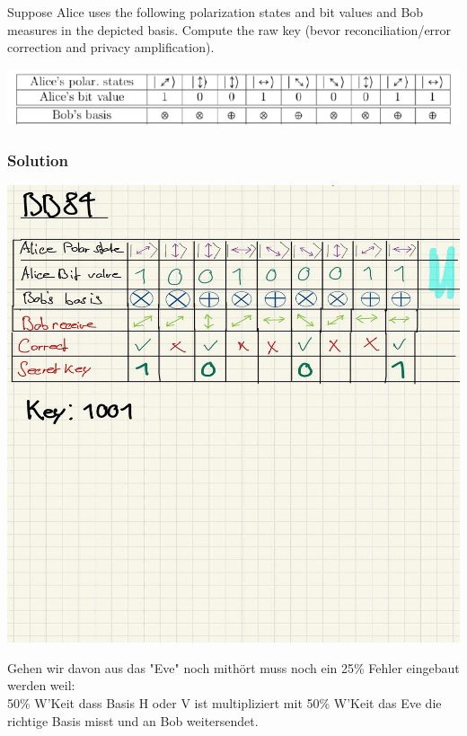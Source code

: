 \documentclass[11pt]{article}
\begin{document}
Suppose Alice uses the following polarization states and bit values and
Bob measures in the depicted basis. Compute the raw key (bevor
reconciliation/error correction and privacy amplification).

\begin{center}
	\includegraphics[scale=0.9]{img/ex02.png}
\end{center}

\hypertarget{solution}{%
\subsubsection{Solution}\label{solution}}

\begin{center}
	\includegraphics[scale=0.8]{img/bb84_1.jpg}
\end{center}

Gehen wir davon aus das "Eve" noch mithört muss noch ein 25\% Fehler eingebaut werden weil: \\
50\% W'Keit dass Basis H oder V ist multipliziert mit 50\% W'Keit das Eve die richtige Basis misst und an Bob weitersendet.
\end{document}
